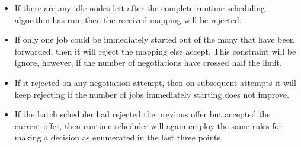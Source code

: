 \begin{itemize}
\item If there are any idle nodes left after the complete runtime scheduling algorithm has run, then the received mapping will be rejected.
\item If only one job could be immediately started out of the many that have been forwarded, then it will reject the mapping else accept. This
constraint will be ignore, however, if the number of negotiations have crossed half the limit.
\item If it rejected on any negotiation attempt, then on subsequent attempts it will keep rejecting if the number of jobs immediately starting does not improve.
\item If the batch scheduler had rejected the previous offer but accepted the current offer, then runtime scheduler will again employ the same rules for making a decision as enumerated in the last three points.
\end{itemize}
